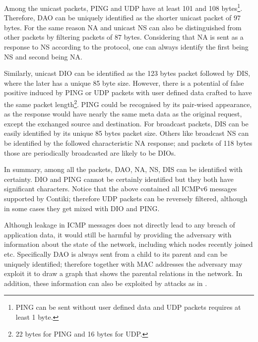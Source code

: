 
Among the unicast packets, PING and UDP have at least 101 and 108 bytes\footnote{PING can be sent without user defined data and UDP packets requires at least 1 byte.}. Therefore, DAO can be uniquely identified as the shorter unicast packet of $97$ bytes.  For the same reason NA and unicast NS can also be distinguished from other packets by filtering packets of $87$ bytes. Considering that NA is sent as a response to NS according to the protocol, one can always identify the first being NS and second being NA. 

Similarly, unicast DIO can be identified as the 123 bytes packet followed by DIS, where the later has a unique 85 byte size. However, there is a potential of false positive induced by PING or UDP packets with user defined data crafted to have the same packet length\footnote{22 bytes for PING and 16 bytes for UDP.}. PING could be recognised by its pair-wised appearance, as the response would have nearly the same meta data as the original request, except the exchanged source and destination. For broadcast packets, DIS can be easily identified by its unique 85 bytes packet size. Others like broadcast NS can be identified by the followed characteristic NA response; and packets of 118 bytes those are periodically broadcasted are likely to be DIOs.

In summary, among all the packets, DAO, NA, NS, DIS can be identified with certainty. DIO and PING cannot be certainly identified but they both have significant characters. Notice that the above contained all ICMPv6 messages supported by Contiki; therefore UDP packets can be reversely filtered, although in some cases they get mixed with DIO and PING.

Although leakage in ICMP messages does not directly lead to any breach of application data, it would still be harmful by providing the adversary with information about the state of the network, including which nodes recently joined etc. Specifically DAO is always sent from a child to its parent and can be uniquely identified; therefore together with MAC addresses the adversary may exploit it to draw a graph that shows the parental relations in the network. In addition, these information can also be exploited by attacks as in \cite{WsnIcmp}.

